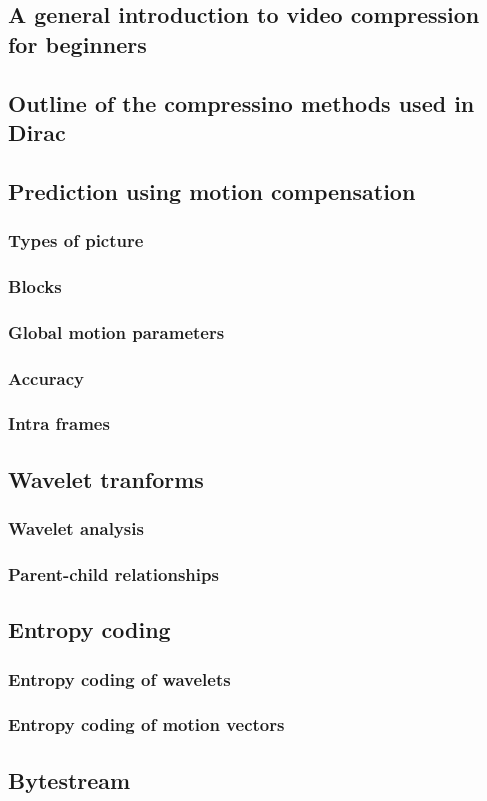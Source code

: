 
\subsection{A general introduction to video compression for beginners}
\subsection{Outline of the compressino methods used in Dirac}
\subsection{Prediction using motion compensation}
\subsubsection{Types of picture}
\subsubsection{Blocks}
\subsubsection{Global motion parameters}
\subsubsection{Accuracy}
\subsubsection{Intra frames}
\subsection{Wavelet tranforms}
\subsubsection{Wavelet analysis}
\subsubsection{Parent-child relationships}
\subsection{Entropy coding}
\subsubsection{Entropy coding of wavelets}
\subsubsection{Entropy coding of motion vectors}
\subsection{Bytestream}
